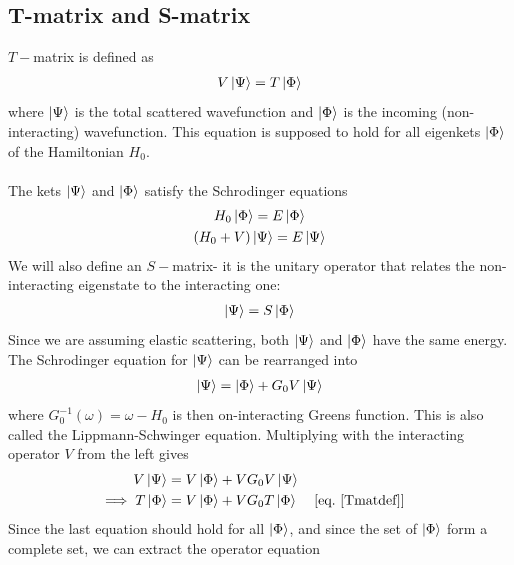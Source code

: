 \documentclass[twoside,11pt]{report}
\numberwithin{equation}{section}
\begin{document}
\subsection{T-matrix and S-matrix}
\(T-\)matrix is defined as\cite{sakurai}
\begin{equation}\begin{aligned}
\label{Tmatdef}
V\ket{\Psi} = T\ket{\Phi}
\end{aligned}\end{equation}
where \(\ket{\Psi}\) is the total scattered wavefunction and \(\ket{\Phi}\) is the incoming (non-interacting) wavefunction. This equation is supposed to hold for all eigenkets \(\ket{\Phi}\) of the Hamiltonian \(H_0\). 
\\\\The kets \(\ket{\Psi}\) and \(\ket{\Phi}\) satisfy the Schrodinger equations
\begin{gather}
	H_0 \ket{\Phi} = E \ket{\Phi}\\
(H_0 + V)\ket{\Psi} = E \ket{\Psi}
\end{gather}
We will also define an \(S-\)matrix- it is the unitary operator that relates the non-interacting eigenstate to the interacting one:
\begin{equation}\begin{aligned}
\label{Smatdef}
\ket{\Psi} = S\ket{\Phi}
\end{aligned}\end{equation}
Since we are assuming elastic scattering, both \(\ket{\Psi}\) and \(\ket{\Phi}\) have the same energy.
The Schrodinger equation for \(\ket{\Psi}\) can be rearranged into
\begin{equation}\begin{aligned}
	\label{lse}
\ket{\Psi} = \ket{\Phi} + G_0V\ket{\Psi}
\end{aligned}\end{equation}
where \(G_0^{-1}(\omega) = \omega - H_0\) is then on-interacting Greens function.
This is also called the Lippmann-Schwinger equation.
Multiplying with the interacting operator \(V\) from the left gives
\begin{equation}\begin{aligned}
	V\ket{\Psi} &= V\ket{\Phi} + VG_0V\ket{\Psi}\\
	\implies T\ket{\Phi} &= V\ket{\Phi} + VG_0 T\ket{\Phi} && \left[ \text{eq.~\ref{Tmatdef}} \right] 
\end{aligned}\end{equation}
Since the last equation should hold for all \(\ket{\Phi}\), and since the set of \(\ket{\Phi}\) form a complete set, we can extract the operator equation
\end{document}
